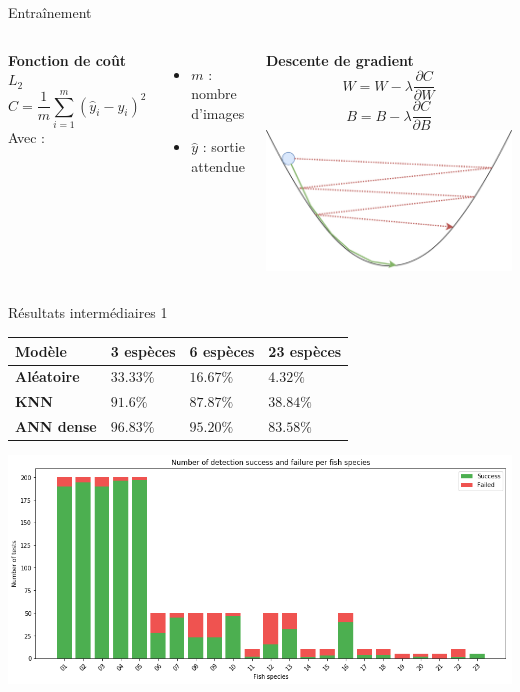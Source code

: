 \documentclass[10pt,xcolor={x11names}]{beamer}
\newcommand{\sectitle}[1]{{\large\color{titleblue}\textbf{#1}\\\smallskip}}
\begin{document}
\begin{frame}{Entraînement}
	\begin{columns}[T]
		\sectitle{Fonction de coût $L_2$}
		$$
		C=\frac{1}{m}\sum_{i=1}^m (\hat{y}_i-y_i)^2
		$$
		Avec :
		\begin{itemize}
			\item $m$ : nombre d'images
			\item $\hat{y}$ : sortie attendue
		\end{itemize}
		\sectitle{Descente de gradient}
		$$
		W = W - \lambda \frac{\partial C}{\partial W}
		$$
		$$
		B = B - \lambda \frac{\partial C}{\partial B}
		$$
		{\centering\includegraphics[width=\textwidth]{gradient.png}}
	\end{columns}
\end{frame}

\begin{frame}{Résultats intermédiaires 1}
	\begin{tabular}{ |m{10em}|m{5.5em}|m{5.5em}|m{5.5em}| }
		\hline
		Modèle & \textbf{3 espèces} & \textbf{6 espèces} &  \textbf{23 espèces} \\
		\hline
		\textbf{Aléatoire} & $33.33\%$ & $16.67\%$ & $4.32\%$ \\
		\textbf{KNN} & $91.6\%$ & $87.87\%$ & $38.84\%$ \\
		\textbf{ANN dense} & $96.83\%$ & $95.20\%$ & $83.58\%$ \\
		\hline
	\end{tabular}
	\begin{center}
	\includegraphics[width=\linewidth]{dense1_results.png}
	\end{center}
\end{frame}
\end{document}
